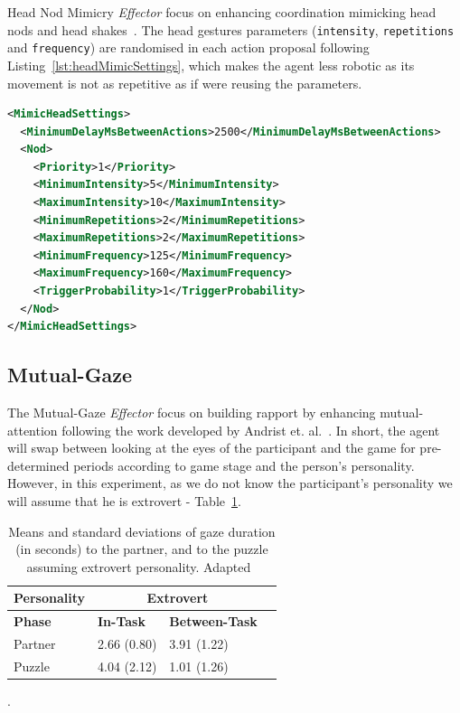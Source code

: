 Head Nod Mimicry \textit{Effector} focus on enhancing coordination mimicking head nods and head shakes~\cite{Riek2009, Andrist2014, Cassell2007, Wang2009}. The head gestures parameters (\texttt{intensity}, \texttt{repetitions} and \texttt{frequency}) are randomised in each action proposal following Listing~\ref{lst:headMimicSettings}, which makes the agent less robotic as its movement is not as repetitive as if were reusing the parameters.

\begin{lstlisting}[caption={Head Gestures Mimicry \textit{Effector} configuration file.},label={lst:headMimicSettings},language=XML]
<MimicHeadSettings>
  <MinimumDelayMsBetweenActions>2500</MinimumDelayMsBetweenActions>
  <Nod>
    <Priority>1</Priority>
    <MinimumIntensity>5</MinimumIntensity>
    <MaximumIntensity>10</MaximumIntensity>
    <MinimumRepetitions>2</MinimumRepetitions>
    <MaximumRepetitions>2</MaximumRepetitions>
    <MinimumFrequency>125</MinimumFrequency>
    <MaximumFrequency>160</MaximumFrequency>
    <TriggerProbability>1</TriggerProbability>
  </Nod>
</MimicHeadSettings>
\end{lstlisting}

\subsection{Mutual-Gaze}
The Mutual-Gaze \textit{Effector} focus on building rapport by enhancing mutual-attention following the work developed by Andrist et. al.~\cite{Andrist2015}. In short, the agent will swap between looking at the eyes of the participant and the game for pre-determined periods according to game stage and the person's personality. However, in this experiment, as we do not know the participant's personality we will assume that he is extrovert - Table~\ref{table:gazetimes}.

\begin{table}[H]
	\centering
	\begin{tabular}{|l|l|l|l|}
	\hline
	\multicolumn{1}{|c|}{\textbf{Personality}} & \multicolumn{2}{c|}{\textbf{Extrovert}}  \\ \hline
	\textbf{Phase}                             & \textbf{In-Task} & \textbf{Between-Task} \\ \hline
	Partner                                    & 2.66 (0.80)      & 3.91 (1.22)           \\ \hline
	Puzzle                                     & 4.04 (2.12)      & 1.01 (1.26)           \\ \hline
	\end{tabular}
	
	\caption{Means and standard deviations of gaze duration (in seconds) to the partner, and to the puzzle assuming extrovert personality. Adapted~\cite{Andrist2015}}.
	\label{table:gazetimes}
\end{table}

